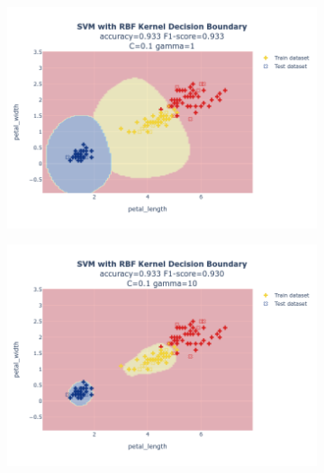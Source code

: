 \documentclass{article}
\begin{document}
\begin{figure}
\begin{subfigure}{0.3\textwidth}
        \includegraphics[scale=.13]{images/implementation/q1/rbf_kernel/petal_length_petal_width_0.1_1.png}
    \end{subfigure}
    \hfill
    \begin{subfigure}{0.3\textwidth}
        \centering
        \includegraphics[scale=.13]{images/implementation/q1/rbf_kernel/petal_length_petal_width_0.1_10.png}
    \end{subfigure}
    \newline
    \begin{subfigure}{0.3\textwidth}
        \centering

\end{subfigure}
\end{figure}
\end{document}
